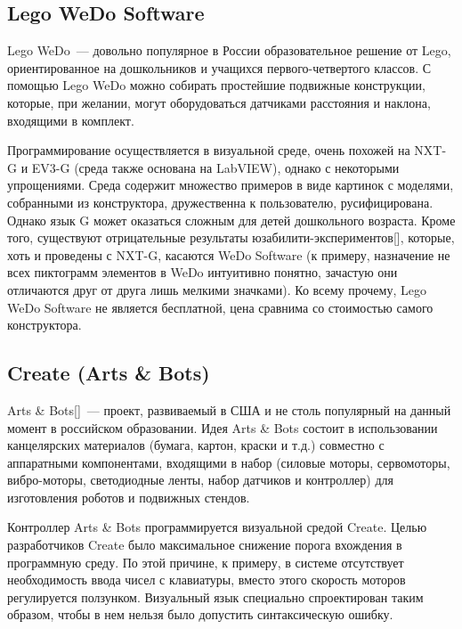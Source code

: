 \documentclass[a5paper]{article}
\begin{document}
\subsection{Lego WeDo Software}

Lego WeDo~--- довольно популярное в России образовательное решение от Lego, ориентированное на дошкольников и 
учащихся первого-четвертого классов. С помощью Lego WeDo можно собирать простейшие подвижные конструкции, 
которые, при желании, могут оборудоваться датчиками расстояния и наклона, входящими в комплект.

Программирование осуществляется в визуальной среде, очень похожей на NXT-G и EV3-G (среда также основана 
на LabVIEW), однако с некоторыми упрощениями. Среда содержит множество примеров в виде картинок с моделями, 
собранными из конструктора, дружественна к пользователю, русифицирована. Однако язык G может оказаться 
сложным для детей дошкольного возраста. Кроме того, существуют отрицательные результаты юзабилити-экспериментов[], 
которые, хоть и проведены с NXT-G, касаются WeDo Software (к примеру, назначение не всех пиктограмм элементов 
в WeDo интуитивно понятно, зачастую они отличаются друг от друга лишь мелкими значками). Ко всему прочему, 
Lego WeDo Software не является бесплатной, цена сравнима со стоимостью самого конструктора.

\subsection{Create (Arts \& Bots)}

Arts \& Bots[]~--- проект, развиваемый в США и не столь популярный на данный момент в российском образовании. 
Идея Arts \& Bots состоит в использовании канцелярских материалов (бумага, картон, краски и т.д.) совместно 
с аппаратными компонентами, входящими в набор (силовые моторы, сервомоторы, вибро-моторы, светодиодные ленты, 
набор датчиков и контроллер) для изготовления роботов и подвижных стендов. 

Контроллер Arts \& Bots программируется визуальной средой Create. Целью разработчиков Create было максимальное 
снижение порога вхождения в программную среду. По этой причине, к примеру, в системе отсутствует необходимость 
ввода чисел с клавиатуры, вместо этого скорость моторов регулируется ползунком. Визуальный язык специально 
спроектирован таким образом, чтобы в нем нельзя было допустить синтаксическую ошибку.
\end{document}
